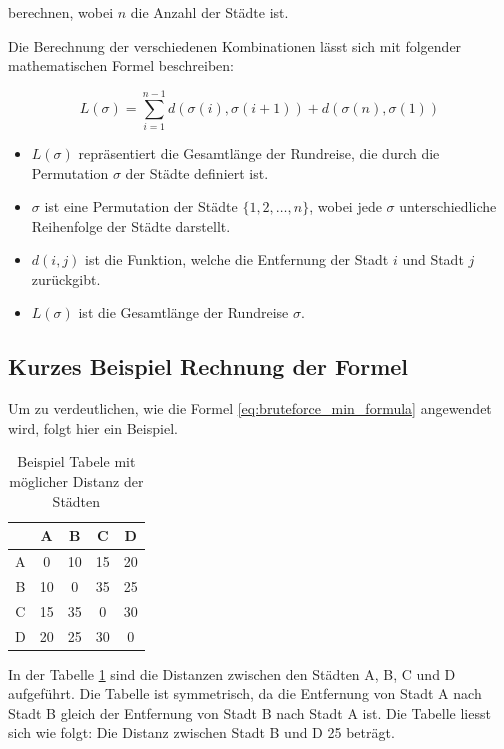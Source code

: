 berechnen, wobei \(n\) die Anzahl der Städte ist.

Die Berechnung der verschiedenen Kombinationen lässt sich mit folgender 
mathematischen Formel beschreiben:

\begin{equation}
    \label{eq:bruteforce_min_formula}
    L(\sigma) = \sum_{i=1}^{n-1} d(\sigma(i), \sigma(i+1)) + d(\sigma(n), \sigma(1))
\end{equation}

\begin{itemize}
    \item \( L(\sigma) \) repräsentiert die Gesamtlänge der Rundreise, die durch
          die Permutation \( \sigma \) der Städte definiert ist.
    \item \( \sigma \) ist eine Permutation der Städte \( \{1, 2, \ldots, n\} \),
          wobei jede \( \sigma \) unterschiedliche Reihenfolge der Städte darstellt.
    \item \( d(i, j) \) ist die Funktion, welche die Entfernung der Stadt \( i \) und
          Stadt \( j \) zurückgibt.
    \item \( L(\sigma) \) ist die Gesamtlänge der Rundreise \( \sigma \).
\end{itemize}
\subsection{Kurzes Beispiel Rechnung der Formel
    \label{variationsprinzip_algorithmen:section:bruteforce_calculate}}
Um zu verdeutlichen, wie die Formel \ref{eq:bruteforce_min_formula}
angewendet wird, folgt hier ein Beispiel.

\begin{table}[h]
    \centering
    \begin{tabular}{|c|c|c|c|c|}
        \hline
          & A  & B  & C  & D  \\ \hline
        A & 0  & 10 & 15 & 20 \\ \hline
        B & 10 & 0  & 35 & 25 \\ \hline
        C & 15 & 35 & 0  & 30 \\ \hline
        D & 20 & 25 & 30 & 0  \\ \hline
    \end{tabular}
    \caption{Beispiel Tabele mit möglicher Distanz der Städten}
    \label{tab:example_bruteforce_cities}
\end{table}

In der Tabelle \ref{tab:example_bruteforce_cities} sind die Distanzen 
zwischen den Städten A, B, C und D aufgeführt. Die Tabelle ist symmetrisch, 
da die Entfernung von Stadt A nach Stadt B gleich der Entfernung von 
Stadt B nach Stadt A ist.
Die Tabelle liesst sich wie folgt: Die Distanz zwischen Stadt B und D 25 beträgt.

